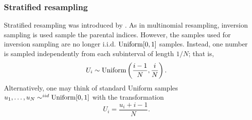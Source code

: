 


\subsubsection{Stratified resampling}
Stratified resampling was introduced by \textcite{kitagawa1996}.
As in multinomial resampling, inversion sampling is used sample the parental indices. However, the samples used for inversion sampling are no longer i.i.d. $\operatorname{Uniform}[0,1]$ samples. Instead, one number is sampled independently from each subinterval of length $1/N$; that is, 
\begin{equation*}
U_i \sim \operatorname{Uniform} \left(\frac{i-1}{N}, \frac{i}{N} \right) .
\end{equation*}
Alternatively, one may think of standard Uniform samples $u_1,\dots,u_N \sim^{iid} \operatorname{Uniform}[0,1]$ with the transformation
\begin{equation*}
U_i = \frac{u_i + i -1}{N} .
\end{equation*}

